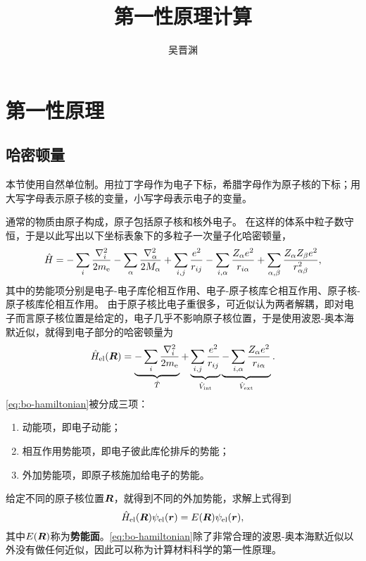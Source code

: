 \documentclass[hyperref, UTF8, a4paper]{ctexart}
\title{第一性原理计算}
\author{吴晋渊}
\begin{document}
\maketitle

\section{第一性原理}

\subsection{哈密顿量}

本节使用自然单位制。用拉丁字母作为电子下标，希腊字母作为原子核的下标；用大写字母表示原子核的变量，小写字母表示电子的变量。

通常的物质由原子构成，原子包括原子核和核外电子。
在这样的体系中粒子数守恒，于是以此写出以下坐标表象下的多粒子一次量子化哈密顿量，
\begin{equation}
    \hat{H} = - \sum_{i} \frac{\laplacian_i}{2 m_\text{e}} - \sum_{\alpha} \frac{\laplacian_\alpha}{2 M_\alpha}
    + \sum_{i, j} \frac{e^2}{r_{ij}} - \sum_{i, \alpha} \frac{Z_\alpha e^2}{r_{i\alpha}} + \sum_{\alpha, \beta} \frac{Z_\alpha Z_\beta e^2}{r_{\alpha \beta}^2},
\end{equation}
其中的势能项分别是电子-电子库伦相互作用、电子-原子核库仑相互作用、原子核-原子核库伦相互作用。
由于原子核比电子重很多，可近似认为两者解耦，即对电子而言原子核位置是给定的，电子几乎不影响原子核位置，于是使用波恩-奥本海默近似，就得到电子部分的哈密顿量为
\begin{equation}
    \hat{H}_\text{el}(\vb*{R}) = \underbrace{- \sum_{i} \frac{\laplacian_i}{2 m_\text{e}}}_{\hat{T}} + \underbrace{\sum_{i, j} \frac{e^2}{r_{ij}}}_{\hat{V}_\text{int}} \underbrace{- \sum_{i, \alpha} \frac{Z_\alpha e^2}{r_{i\alpha}}}_{\hat{V}_\text{ext}}.
    \label{eq:bo-hamiltonian}
\end{equation}
\eqref{eq:bo-hamiltonian}被分成三项：
\begin{enumerate}
    \item 动能项，即电子动能；
    \item 相互作用势能项，即电子彼此库伦排斥的势能；
    \item 外加势能项，即原子核施加给电子的势能。
\end{enumerate}
给定不同的原子核位置$\vb*{R}$，就得到不同的外加势能，求解上式得到
\begin{equation}
    \hat{H}_\text{el}(\vb*{R}) \psi_\text{el}(\vb*{r}) = E(\vb*{R}) \psi_\text{el}(\vb*{r}),
\end{equation}
其中$E(\vb*{R})$称为\textbf{势能面}。\eqref{eq:bo-hamiltonian}除了非常合理的波恩-奥本海默近似以外没有做任何近似，因此可以称为计算材料科学的第一性原理。
\end{document}
